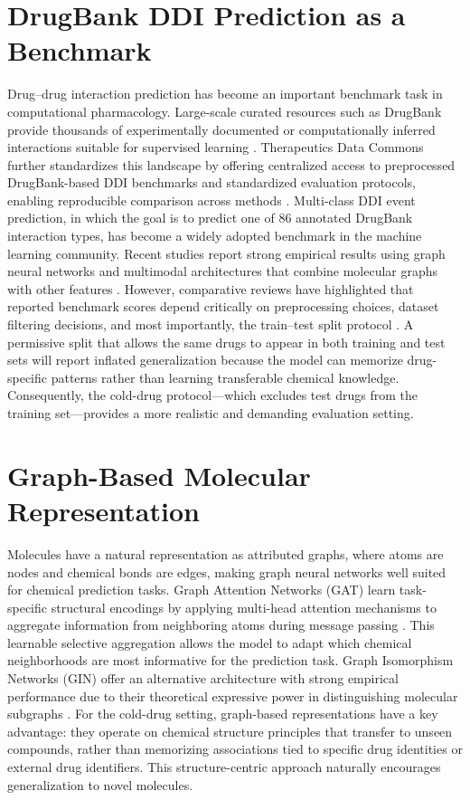\documentclass[11pt,a4paper]{report}
\begin{document}
\section{DrugBank DDI Prediction as a Benchmark}
Drug--drug interaction prediction has become an important benchmark task in computational pharmacology. Large-scale curated resources such as DrugBank provide thousands of experimentally documented or computationally inferred interactions suitable for supervised learning \cite{wishart2018drugbank}. Therapeutics Data Commons further standardizes this landscape by offering centralized access to preprocessed DrugBank-based DDI benchmarks and standardized evaluation protocols, enabling reproducible comparison across methods \cite{huang2021tdc}. Multi-class DDI event prediction, in which the goal is to predict one of 86 annotated DrugBank interaction types, has become a widely adopted benchmark in the machine learning community. Recent studies report strong empirical results using graph neural networks and multimodal architectures that combine molecular graphs with other features \cite{alrabeah2022gnn, xiong2023mrgnn, gupta2024graphddi, abbas2025gnnddi}. However, comparative reviews have highlighted that reported benchmark scores depend critically on preprocessing choices, dataset filtering decisions, and most importantly, the train--test split protocol \cite{lin2023evaluation, luo2024review}. A permissive split that allows the same drugs to appear in both training and test sets will report inflated generalization because the model can memorize drug-specific patterns rather than learning transferable chemical knowledge. Consequently, the cold-drug protocol---which excludes test drugs from the training set---provides a more realistic and demanding evaluation setting.
\section{Graph-Based Molecular Representation}
Molecules have a natural representation as attributed graphs, where atoms are nodes and chemical bonds are edges, making graph neural networks well suited for chemical prediction tasks. Graph Attention Networks (GAT) learn task-specific structural encodings by applying multi-head attention mechanisms to aggregate information from neighboring atoms during message passing \cite{velickovic2018gat}. This learnable selective aggregation allows the model to adapt which chemical neighborhoods are most informative for the prediction task. Graph Isomorphism Networks (GIN) offer an alternative architecture with strong empirical performance due to their theoretical expressive power in distinguishing molecular subgraphs \cite{xu2019gin}. For the cold-drug setting, graph-based representations have a key advantage: they operate on chemical structure principles that transfer to unseen compounds, rather than memorizing associations tied to specific drug identities or external drug identifiers. This structure-centric approach naturally encourages generalization to novel molecules.
\end{document}
